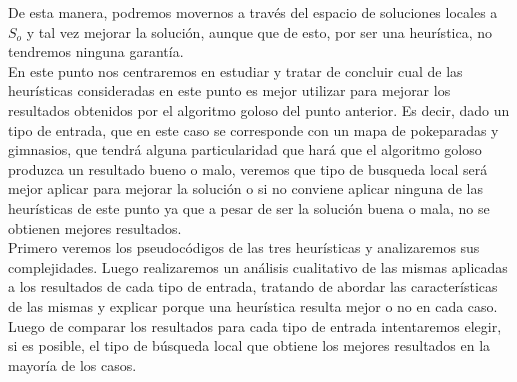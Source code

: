 De esta manera, podremos movernos a través del espacio de soluciones locales a $S_o$ y tal vez mejorar la solución, aunque que de esto, por ser una heurística, no tendremos ninguna garantía.\\

En este punto nos centraremos en estudiar y tratar de concluir cual de las heurísticas consideradas en este punto es mejor utilizar para mejorar los resultados obtenidos por el algoritmo goloso del punto anterior. Es decir, dado un tipo de entrada, que en este caso se corresponde con un mapa de pokeparadas y gimnasios, que tendrá alguna particularidad que hará que el algoritmo goloso produzca un resultado bueno o malo, veremos que tipo de busqueda local será mejor aplicar para mejorar la solución o si no conviene aplicar ninguna de las heurísticas de este punto ya que a pesar de ser la solución buena o mala, no se obtienen mejores resultados.\\

Primero veremos los pseudocódigos de las tres heurísticas y analizaremos sus complejidades. Luego realizaremos un análisis cualitativo de las mismas aplicadas a los resultados de cada tipo de entrada, tratando de abordar las características de las mismas y explicar porque una heurística resulta mejor o no en cada caso. Luego de comparar los resultados para cada tipo de entrada intentaremos elegir, si es posible, el tipo de búsqueda local que obtiene los mejores resultados en la mayoría de los casos.

